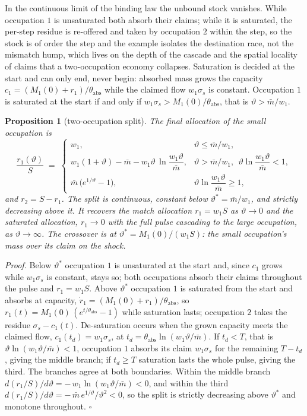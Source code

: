 \documentclass[12pt, a4paper]{article}
\newtheorem{proposition}{Proposition}
\begin{document}
In the continuous limit of the binding law the unbound stock vanishes.
While occupation $1$ is unsaturated both absorb their claims; while it
is saturated, the per-step residue is re-offered and taken by
occupation $2$ within the step, so the stock is of order the step and
the example isolates the destination race, not the mismatch hump, which
lives on the depth of the cascade and the spatial locality of claims
that a two-occupation economy collapses. Saturation is decided at the
start and can only end, never begin: absorbed mass grows the capacity
$c_1 = (M_1(0) + r_1)/\theta_{\text{abs}}$ while the claimed flow
$w_1\sigma_s$ is constant. Occupation $1$ is saturated at the start if
and only if $w_1\sigma_s > M_1(0)/\theta_{\text{abs}}$, that is
$\vartheta > \bar m/w_1$.

\begin{proposition}[two-occupation split]
\label{prop:two-occ}
The final allocation of the small occupation is
\begin{equation}
\frac{r_1(\vartheta)}{S} \;=\;
\begin{cases}
w_1,
& \vartheta \le \bar m/w_1,\\[4pt]
w_1(1+\vartheta) - \bar m - w_1\vartheta\,\ln\!\dfrac{w_1\vartheta}{\bar m},
& \vartheta > \bar m/w_1,\ \ \vartheta\ln\!\dfrac{w_1\vartheta}{\bar m} < 1,\\[8pt]
\bar m\,\bigl(e^{1/\vartheta} - 1\bigr),
& \vartheta\ln\!\dfrac{w_1\vartheta}{\bar m} \ge 1,
\end{cases}
\label{eq:two-occ-split}
\end{equation}
and $r_2 = S - r_1$. The split is continuous, constant below
$\vartheta^* = \bar m/w_1$, and strictly decreasing above it. It recovers the
match allocation $r_1 = w_1 S$ as $\vartheta \to 0$ and the saturated
allocation, $r_1 \to 0$ with the full pulse cascading to the large
occupation, as $\vartheta \to \infty$. The crossover is at
$\vartheta^* = M_1(0)/(w_1 S)$: the small occupation's mass over its claim
on the shock.
\end{proposition}

\noindent\emph{Proof.} Below $\vartheta^*$ occupation $1$ is unsaturated at
the start and, since $c_1$ grows while $w_1\sigma_s$ is constant, stays
so; both occupations absorb their claims throughout the pulse and
$r_1 = w_1 S$. Above $\vartheta^*$ occupation $1$ is saturated from the
start and absorbs at capacity,
$\dot r_1 = (M_1(0) + r_1)/\theta_{\text{abs}}$, so
$r_1(t) = M_1(0)\,(e^{t/\theta_{\text{abs}}} - 1)$ while saturation
lasts; occupation $2$ takes the residue $\sigma_s - c_1(t)$.
De-saturation occurs when the grown capacity meets the claimed flow,
$c_1(t_d) = w_1\sigma_s$, at
$t_d = \theta_{\text{abs}}\ln(w_1\vartheta/\bar m)$. If $t_d < T$, that is
$\vartheta\ln(w_1\vartheta/\bar m) < 1$, occupation $1$ absorbs its claim
$w_1\sigma_s$ for the remaining $T - t_d$, giving the middle branch;
if $t_d \ge T$ saturation lasts the whole pulse, giving the third. The
branches agree at both boundaries. Within the middle branch
$d(r_1/S)/d\vartheta = -\,w_1 \ln(w_1\vartheta/\bar m) < 0$, and within the third
$d(r_1/S)/d\vartheta = -\,\bar m\,e^{1/\vartheta}/\vartheta^{2} < 0$, so the split is
strictly decreasing above $\vartheta^*$ and monotone throughout.
\hfill$\square$
\end{document}
